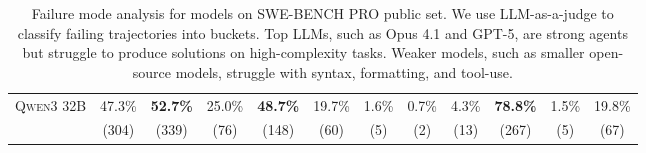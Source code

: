 \begin{table}[t]
\begin{adjustbox}{max width=\linewidth}
\begin{tabular}{|l|cc|cccccc|ccc|}
\hline
\textsc{Qwen3 32B}  & 47.3\% & \textbf{52.7\%} & 25.0\% & \textbf{48.7\%} & 19.7\% & 1.6\% & 0.7\% & 4.3\%  & \textbf{78.8\%} & 1.5\%  & 19.8\% \\
           & (304)  & (339)  & (76)   & (148)  & (60)  & (5)   & (2)   & (13)   & (267)  & (5)    & (67)   \\
\hline
\end{tabular}
\end{adjustbox}
\caption{Failure mode analysis for models on SWE-BENCH PRO public set. We use LLM-as-a-judge to classify failing trajectories into buckets. Top LLMs, such as Opus 4.1 and GPT-5, are strong agents but struggle to produce solutions on high-complexity tasks. Weaker models, such as smaller open-source models, struggle with syntax, formatting, and tool-use.}
\label{table:failure-analysis}
\end{table}